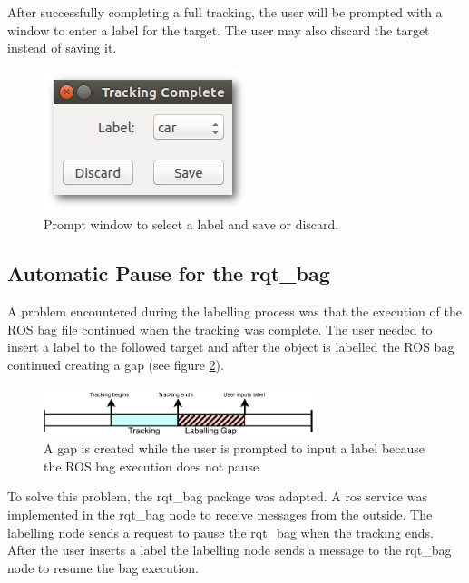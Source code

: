 After successfully completing a full tracking, the user will be prompted with a window to enter a label for the target. The user may also discard the target instead of saving it.


\begin{figure}[htp]
	\centering
	\includegraphics[width=.4\textwidth]{caplabel/imgs/labellinggui2.png}
	\caption{Prompt window to select a label and save or discard.}
	\label{fig:labellinggui2}
\end{figure}

\subsection{Automatic Pause for the rqt\_bag}

A problem encountered during the labelling process was that the execution of the ROS bag file continued when the tracking was complete. The user needed to insert a label to the followed target and after the object is labelled the ROS bag continued creating a gap (see figure \ref{fig:problem}). 

\begin{figure}[htp]
	
	\centering
	\includegraphics[width=0.7\textwidth]{caplabel/imgs/diagramtracking.pdf}
	
	\caption{A gap is created while the user is prompted to input a label because the ROS bag execution does not pause}
	\label{fig:problem}
	
\end{figure}

To solve this problem, the rqt\_bag package was adapted. A \gls{ros} service was implemented in the rqt\_bag node to receive messages from the outside. The labelling node sends a request to pause the rqt\_bag when the tracking ends. After the user inserts a label the labelling node sends a message to the rqt\_bag node to resume the bag execution.


